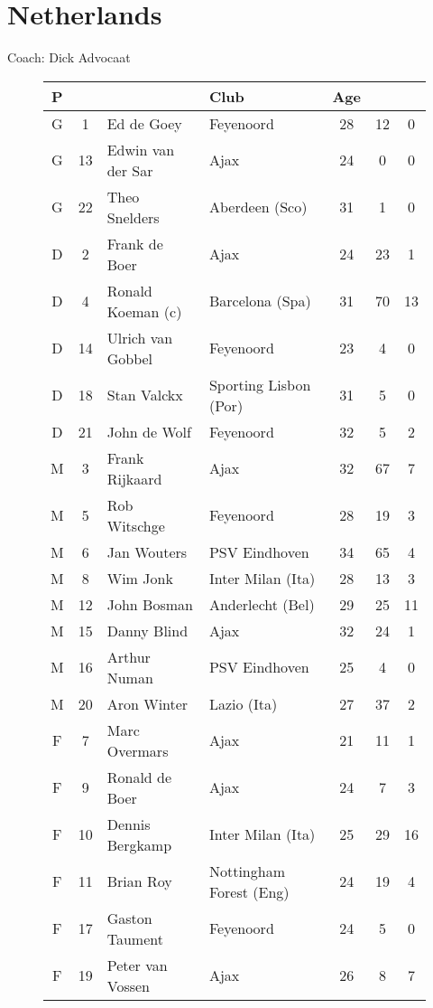 \chapter{Netherlands}
\newline
\newline
Coach: Dick Advocaat
\begin{figure}[H]
\begin{tabular}{c c l l c c c}
P & & & Club & Age \\ \hline
G & 1 & Ed de Goey & Feyenoord & 28 & 12 & 0 \\
G & 13 & Edwin van der Sar & Ajax & 24 & 0 & 0 \\
G & 22 & Theo Snelders & Aberdeen (Sco) & 31 & 1 & 0 \\ \hline
D & 2 & Frank de Boer & Ajax & 24 & 23 & 1 \\
D & 4 & Ronald Koeman (c) & Barcelona (Spa) & 31 & 70 & 13 \\
D & 14 & Ulrich van Gobbel & Feyenoord & 23 & 4 & 0 \\
D & 18 & Stan Valckx & Sporting Lisbon (Por) & 31 & 5 & 0 \\
D & 21 & John de Wolf & Feyenoord & 32 & 5 & 2 \\ \hline
M & 3 & Frank Rijkaard & Ajax & 32 & 67 & 7 \\
M & 5 & Rob Witschge & Feyenoord & 28 & 19 & 3 \\
M & 6 & Jan Wouters & PSV Eindhoven & 34 & 65 & 4\\
M & 8 & Wim Jonk & Inter Milan (Ita) & 28 & 13 & 3 \\
M & 12 & John Bosman & Anderlecht (Bel) & 29 & 25 & 11 \\
M & 15 & Danny Blind & Ajax & 32 & 24 & 1 \\
M & 16 & Arthur Numan & PSV Eindhoven & 25 & 4 & 0 \\
M & 20 & Aron Winter & Lazio (Ita) & 27 & 37 & 2 \\ \hline
F & 7 & Marc Overmars & Ajax & 21 & 11 & 1 \\
F & 9 & Ronald de Boer & Ajax & 24 & 7 & 3 \\
F & 10 & Dennis Bergkamp & Inter Milan (Ita) & 25 & 29 & 16 \\
F & 11 & Brian Roy & Nottingham Forest (Eng) & 24 & 19 & 4 \\
F & 17 & Gaston Taument & Feyenoord & 24 & 5 & 0 \\
F & 19 & Peter van Vossen & Ajax & 26 & 8 & 7 \\ \hline
\end{tabular}
\end{figure}
